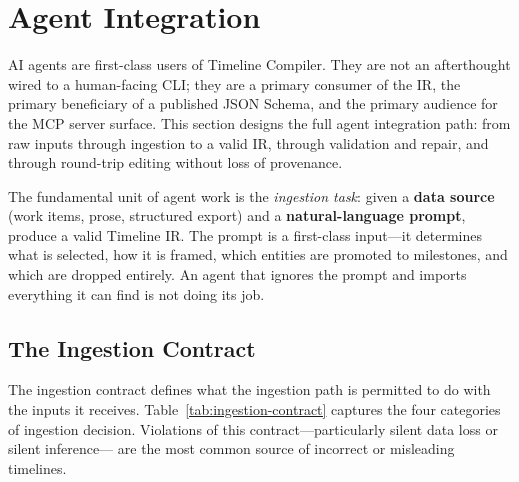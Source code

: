 \section{Agent Integration}
\label{sec:agent-integration}

AI agents are first-class users of Timeline Compiler. They are not an afterthought wired to
a human-facing CLI; they are a primary consumer of the IR, the primary beneficiary of a
published JSON Schema, and the primary audience for the MCP server surface. This section
designs the full agent integration path: from raw inputs through ingestion to a valid IR,
through validation and repair, and through round-trip editing without loss of provenance.

The fundamental unit of agent work is the \emph{ingestion task}: given a \textbf{data source}
(work items, prose, structured export) and a \textbf{natural-language prompt}, produce a valid
Timeline IR. The prompt is a first-class input---it determines what is selected, how it is
framed, which entities are promoted to milestones, and which are dropped entirely. An agent
that ignores the prompt and imports everything it can find is not doing its job.


\subsection{The Ingestion Contract}
\label{sec:ingestion-contract}

The ingestion contract defines what the ingestion path is permitted to do with the inputs it
receives. Table~\ref{tab:ingestion-contract} captures the four categories of ingestion
decision. Violations of this contract---particularly silent data loss or silent inference---
are the most common source of incorrect or misleading timelines.

